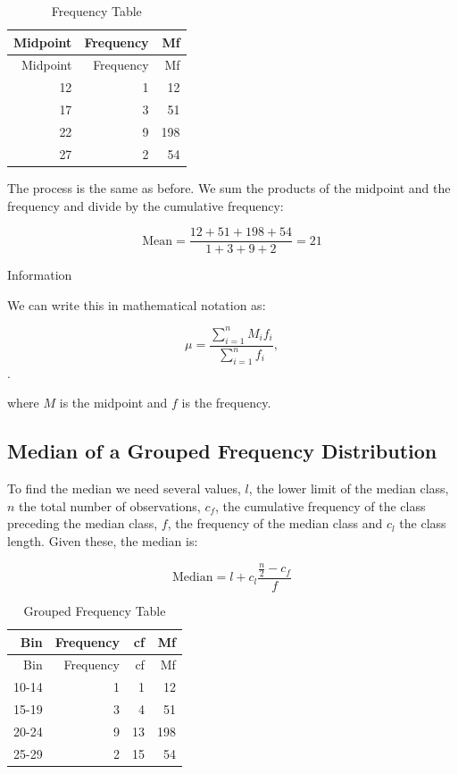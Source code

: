 \documentclass[
]{book}
\begin{document}
\begin{longtable}[]{@{}rrr@{}}
\caption{\label{tab:table000007} Frequency Table}\tabularnewline
\toprule
Midpoint & Frequency & Mf \\
\midrule
\endfirsthead
\toprule
Midpoint & Frequency & Mf \\
\midrule
\endhead
12 & 1 & 12 \\
17 & 3 & 51 \\
22 & 9 & 198 \\
27 & 2 & 54 \\
\bottomrule
\end{longtable}

The process is the same as before. We sum the products of the midpoint and the frequency and divide by the cumulative frequency:

\[\textrm{Mean}=\frac{12+51+198+54}{1+3+9+2}=21\]

Information

We can write this in mathematical notation as:

\[ \mu=\frac{\sum_{i=1}^n M_i f_i}{\sum_{i=1}^n f_i},\].

where \(M\) is the midpoint and \(f\) is the frequency.

\hypertarget{median-of-a-grouped-frequency-distribution}{%
\subsection{Median of a Grouped Frequency Distribution}\label{median-of-a-grouped-frequency-distribution}}

To find the median we need several values, \(l\), the lower limit of the median class, \(n\) the total number of observations, \(c_f\), the cumulative frequency of the class preceding the median class, \(f\), the frequency of the median class and \(c_l\) the class length. Given these, the median is:

\[\textrm{Median}=l + c_l \frac{\frac{n}{2}-c_f}{f} \]

\begin{longtable}[]{@{}rrrr@{}}
\caption{\label{tab:table0000007} Grouped Frequency Table}\tabularnewline
\toprule
Bin & Frequency & cf & Mf \\
\midrule
\endfirsthead
\toprule
Bin & Frequency & cf & Mf \\
\midrule
\endhead
10-14 & 1 & 1 & 12 \\
15-19 & 3 & 4 & 51 \\
20-24 & 9 & 13 & 198 \\
25-29 & 2 & 15 & 54 \\
\bottomrule
\end{longtable}
\end{document}
